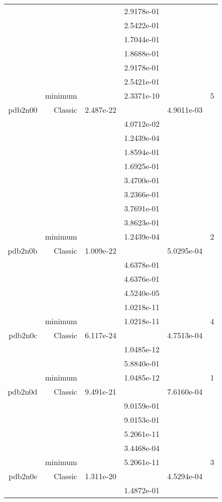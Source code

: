 \begin{xltabular}{\textwidth}{r|rS[table-format=1.3e+2]S[table-format=1.4e+2]S[table-format=1.4e+2]S[table-format=-1.5]}
&  &  & 2.9178e-01 & & \\
&  &  & 2.5422e-01 & & \\
&  &  & 1.7044e-01 & & \\
&  &  & 1.8688e-01 & & \\
&  &  & 2.9178e-01 & & \\
&  &  & 2.5421e-01 & & \\
& minimum &  & 2.3371e-10 & & 5 \\  \addlinespace
pdb2n00 & Classic & 2.487e-22 &  & 4.9011e-03 & \\
&  &  & 4.0712e-02 & & \\
&  &  & 1.2439e-04 & & \\
&  &  & 1.8594e-01 & & \\
&  &  & 1.6925e-01 & & \\
&  &  & 3.4700e-01 & & \\
&  &  & 3.2366e-01 & & \\
&  &  & 3.7691e-01 & & \\
&  &  & 3.8623e-01 & & \\
& minimum &  & 1.2439e-04 & & 2 \\  \addlinespace
pdb2n0b & Classic & 1.009e-22 &  & 5.0295e-04 & \\
&  &  & 4.6378e-01 & & \\
&  &  & 4.6376e-01 & & \\
&  &  & 4.5240e-05 & & \\
&  &  & 1.0218e-11 & & \\
& minimum &  & 1.0218e-11 & & 4 \\  \addlinespace
pdb2n0c & Classic & 6.117e-24 &  & 4.7513e-04 & \\
&  &  & 1.0485e-12 & & \\
&  &  & 5.8840e-01 & & \\
& minimum &  & 1.0485e-12 & & 1 \\  \addlinespace
pdb2n0d & Classic & 9.491e-21 &  & 7.6160e-04 & \\
&  &  & 9.0159e-01 & & \\
&  &  & 9.0153e-01 & & \\
&  &  & 5.2061e-11 & & \\
&  &  & 3.4468e-04 & & \\
& minimum &  & 5.2061e-11 & & 3 \\  \addlinespace
pdb2n0e & Classic & 1.311e-20 &  & 4.5294e-04 & \\
&  &  & 1.4872e-01 & & \\

\end{xltabular}
